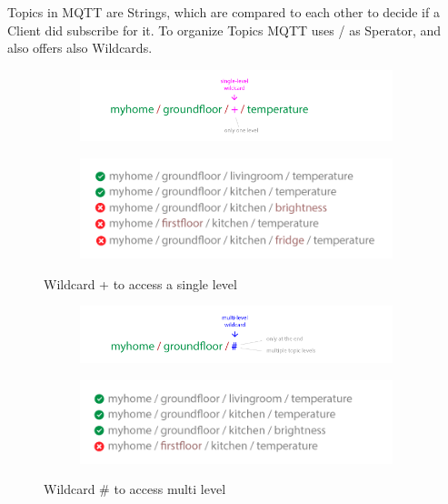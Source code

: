 Topics in MQTT are Strings, which are compared to each other to decide if a Client did subscribe for it. To organize Topics MQTT uses / as Sperator, and also offers also Wildcards.
\begin{figure}[H]
\centering
\begin{subfigure}{.5\textwidth}
  \centering
  \includegraphics[width=.9\linewidth]{images/topic_wildcard_plus.png}
\end{subfigure}%
\begin{subfigure}{.5\textwidth}
  \centering
  \includegraphics[width=.9\linewidth]{images/topic_wildcard_plus_example.png}
\end{subfigure}
\caption{Wildcard + to access a single level \citep{HiveMQ:MQTT-Essentials}}
\end{figure}

\begin{figure}[H]
\centering
\begin{subfigure}{.5\textwidth}
  \centering
  \includegraphics[width=.9\linewidth]{images/topic_wildcard_hash.png}
\end{subfigure}%
\begin{subfigure}{.5\textwidth}
  \centering
  \includegraphics[width=.9\linewidth]{images/topic_wildcard_hash_example.png}
\end{subfigure}
\caption{Wildcard \# to access multi level \citep{HiveMQ:MQTT-Essentials}}
\end{figure}

